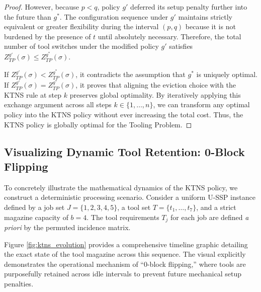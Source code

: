 \documentclass[11pt, a4paper]{book}
\begin{document}
\begin{proof}
		However, because $p < q$, policy $g'$ deferred its setup penalty further into the future than $g^*$. The configuration sequence under $g'$ maintains strictly equivalent or greater flexibility during the interval $(p, q)$ because it is not burdened by the presence of $t$ until absolutely necessary. Therefore, the total number of tool switches under the modified policy $g'$ satisfies $Z_{TP}^{g'}(\sigma) \le Z_{TP}^{g^*}(\sigma)$.
		
		If $Z_{TP}^{g'}(\sigma) < Z_{TP}^{g^*}(\sigma)$, it contradicts the assumption that $g^*$ is uniquely optimal. If $Z_{TP}^{g'}(\sigma) = Z_{TP}^{g^*}(\sigma)$, it proves that aligning the eviction choice with the KTNS rule at step $k$ preserves global optimality. By iteratively applying this exchange argument across all steps $k \in \{1, \dots, n\}$, we can transform any optimal policy into the KTNS policy without ever increasing the total cost. Thus, the KTNS policy is globally optimal for the Tooling Problem.
	\end{proof}
	
	\subsection{Visualizing Dynamic Tool Retention: 0-Block Flipping}
	
	To concretely illustrate the mathematical dynamics of the KTNS policy, we construct a deterministic processing scenario. Consider a uniform U-SSP instance defined by a job set $J = \{1, 2, 3, 4, 5\}$, a tool set $T = \{t_1, \dots, t_7\}$, and a strict magazine capacity of $b = 4$. The tool requirements $T_j$ for each job are defined \textit{a priori} by the permuted incidence matrix.
	
	Figure \ref{fig:ktns_evolution} provides a comprehensive timeline graphic detailing the exact state of the tool magazine across this sequence. The visual explicitly demonstrates the operational mechanism of ``0-block flipping,'' where tools are purposefully retained across idle intervals to prevent future mechanical setup penalties.
	
\end{document}
